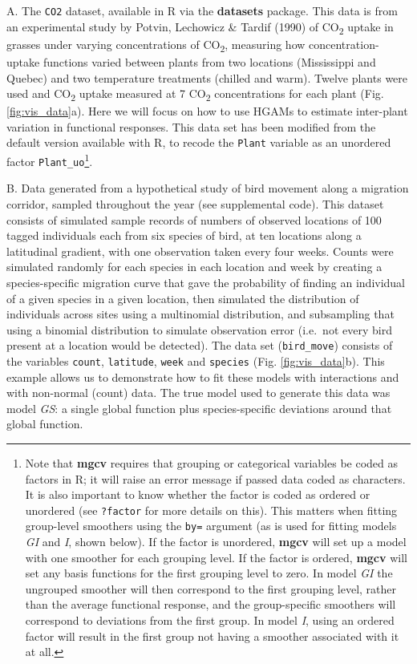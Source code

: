 \documentclass[12pt]{article}
\let\rmarkdownfootnote\footnote%
\def\footnote{\protect\rmarkdownfootnote}
\begin{document}
A. The \texttt{CO2} dataset, available in R via the \textbf{datasets}
package. This data is from an experimental study by Potvin, Lechowicz \&
Tardif (1990) of CO\textsubscript{2} uptake in grasses under varying
concentrations of CO\textsubscript{2}, measuring how
concentration-uptake functions varied between plants from two locations
(Mississippi and Quebec) and two temperature treatments (chilled and
warm). Twelve plants were used and CO\textsubscript{2} uptake measured
at 7 CO\textsubscript{2} concentrations for each plant (Fig.
\ref{fig:vis_data}a). Here we will focus on how to use HGAMs to estimate
inter-plant variation in functional responses. This data set has been
modified from the default version available with R, to recode the
\texttt{Plant} variable as an unordered factor
\texttt{Plant\_uo}\footnote{Note that \textbf{mgcv} requires that
  grouping or categorical variables be coded as factors in R; it will
  raise an error message if passed data coded as characters. It is also
  important to know whether the factor is coded as ordered or unordered
  (see \texttt{?factor} for more details on this). This matters when
  fitting group-level smoothers using the \texttt{by=} argument (as is
  used for fitting models \emph{GI} and \emph{I}, shown below). If the
  factor is unordered, \textbf{mgcv} will set up a model with one
  smoother for each grouping level. If the factor is ordered,
  \textbf{mgcv} will set any basis functions for the first grouping
  level to zero. In model \emph{GI} the ungrouped smoother will then
  correspond to the first grouping level, rather than the average
  functional response, and the group-specific smoothers will correspond
  to deviations from the first group. In model \emph{I}, using an
  ordered factor will result in the first group not having a smoother
  associated with it at all.}.

B. Data generated from a hypothetical study of bird movement along a
migration corridor, sampled throughout the year (see supplemental code).
This dataset consists of simulated sample records of numbers of observed
locations of 100 tagged individuals each from six species of bird, at
ten locations along a latitudinal gradient, with one observation taken
every four weeks. Counts were simulated randomly for each species in
each location and week by creating a species-specific migration curve
that gave the probability of finding an individual of a given species in
a given location, then simulated the distribution of individuals across
sites using a multinomial distribution, and subsampling that using a
binomial distribution to simulate observation error (i.e.~not every bird
present at a location would be detected). The data set
(\texttt{bird\_move}) consists of the variables \texttt{count},
\texttt{latitude}, \texttt{week} and \texttt{species} (Fig.
\ref{fig:vis_data}b). This example allows us to demonstrate how to fit
these models with interactions and with non-normal (count) data. The
true model used to generate this data was model \emph{GS}: a single
global function plus species-specific deviations around that global
function.
\end{document}
